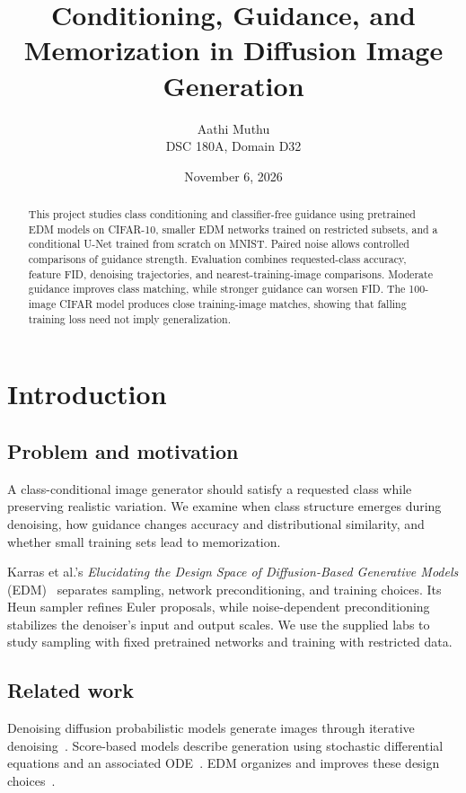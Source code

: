 \documentclass[11pt]{article}
\title{Conditioning, Guidance, and Memorization in Diffusion Image Generation}
\author{Aathi Muthu\\DSC 180A, Domain D32}
\date{November 6, 2026}
\begin{document}
\maketitle
\begin{abstract}
This project studies class conditioning and classifier-free guidance using pretrained EDM models on CIFAR-10, smaller EDM networks trained on restricted subsets, and a conditional U-Net trained from scratch on MNIST. Paired noise allows controlled comparisons of guidance strength. Evaluation combines requested-class accuracy, feature FID, denoising trajectories, and nearest-training-image comparisons. Moderate guidance improves class matching, while stronger guidance can worsen FID. The 100-image CIFAR model produces close training-image matches, showing that falling training loss need not imply generalization.
\end{abstract}

\section{Introduction}
\subsection{Problem and motivation}
A class-conditional image generator should satisfy a requested class while preserving realistic variation. We examine when class structure emerges during denoising, how guidance changes accuracy and distributional similarity, and whether small training sets lead to memorization.

Karras et al.'s \emph{Elucidating the Design Space of Diffusion-Based Generative Models} (EDM)~\cite{karras2022} separates sampling, network preconditioning, and training choices. Its Heun sampler refines Euler proposals, while noise-dependent preconditioning stabilizes the denoiser's input and output scales. We use the supplied labs to study sampling with fixed pretrained networks and training with restricted data.

\subsection{Related work}
Denoising diffusion probabilistic models generate images through iterative denoising~\cite{ho2020}. Score-based models describe generation using stochastic differential equations and an associated ODE~\cite{song2021}. EDM organizes and improves these design choices~\cite{karras2022}.
\end{document}
